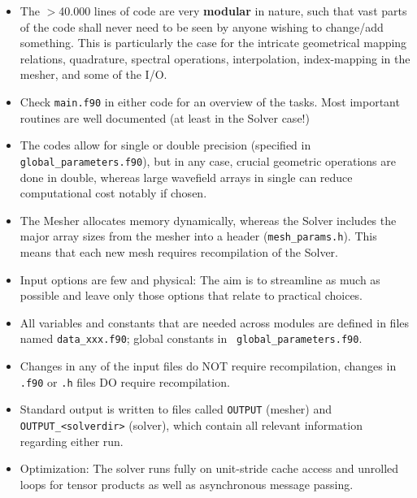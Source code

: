 \documentclass[11pt,letter,fleqn,english,notitlepage]{article}
\begin{document}
\begin{itemize}
    \item The $>$40.000 lines of code are very \textbf{modular} in nature, such
    that vast parts of the code shall never need to be seen by anyone wishing
    to change/add something. This is particularly the case for the intricate
    geometrical mapping relations, quadrature, spectral operations,
    interpolation, index-mapping in the mesher, and some of the I/O.
    
    \item Check {\tt main.f90} in either code for an overview of the tasks.
    Most important routines are well documented (at least in the Solver case!)

    \item The codes allow for single or double precision (specified in {\tt
    global\_parameters.f90}), but in any case, crucial geometric operations are
    done in double, whereas large wavefield arrays in single can reduce
    computational cost notably if chosen.

    \item The Mesher allocates memory dynamically, whereas the Solver includes
    the major array sizes from the mesher into a header ({\tt mesh\_params.h}).
    This means that each new mesh requires recompilation of the Solver. 

    \item Input options are few and physical: The aim is to streamline as much
    as possible and leave only those options that relate to practical choices.

    \item All variables and constants that are needed across modules are
    defined in files named {\tt data\_xxx.f90}; global constants in {\tt
    global\_parameters.f90}.

    \item Changes in any of the input files do NOT require recompilation,
    changes in {\tt *.f90} or {\tt *.h} files DO require recompilation. 

    \item Standard output is written to files called {\tt OUTPUT} (mesher) and
    {\tt OUTPUT\_<solverdir>} (solver), which contain all relevant information
    regarding either run. 

    \item Optimization: The solver runs fully on unit-stride cache access and
    unrolled loops for tensor products as well as asynchronous message passing.


\end{itemize}
\end{document}
